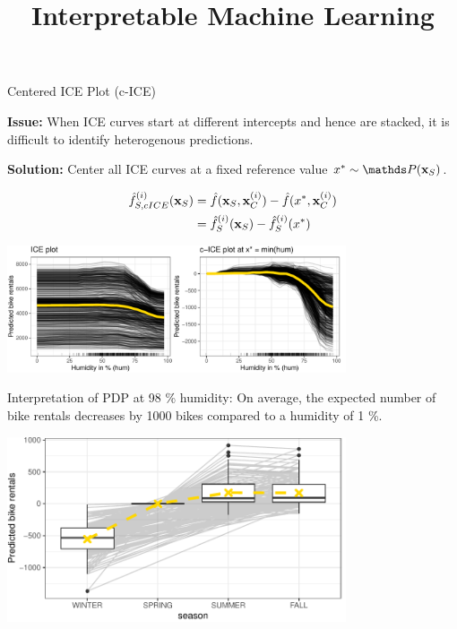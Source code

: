 \documentclass[11pt,compress,t,notes=noshow, aspectratio=169, xcolor=table]{beamer}
\title{Interpretable Machine Learning}
\date{}
\begin{document}
\newcommand{\titlefigure}{figure/pdp_bike}
\newcommand{\learninggoals}{
\item Understand c-ICE curves to identify the heterogeneity in the model
\item Understand the extrapolation issue}



\begin{vbframe}{Centered ICE Plot (c-ICE)}

\textbf{Issue:} When ICE curves start at different intercepts and hence are stacked, it is difficult to identify heterogenous predictions.

\textbf{Solution:} Center all ICE curves at a fixed reference value $x^* \sim \P(\xv_S)$.


$$\begin{aligned}
\fh_{S, cICE}^{(i)}(\xv_S)
&= \fh(\xv_S, \xi_C) - \fh(x^*, \xi_C) \\
&= \fh_{S}^{(i)}(\xv_S) - \fh_{S}^{(i)}(x^*)
\end{aligned}$$

\begin{center}
	\vspace{-0.3cm}
\includegraphics[width=0.75\textwidth]{figure/cICE}
\end{center}
\vspace{-0.4cm}

Interpretation of PDP at 98 \% humidity: On average, the expected number of bike rentals decreases by 1000 bikes compared to a humidity of 1 \%.

\framebreak

\begin{center}
\includegraphics[width=0.75\textwidth]{figure/cICEcat}
\end{center}


\end{vbframe}
\end{document}
